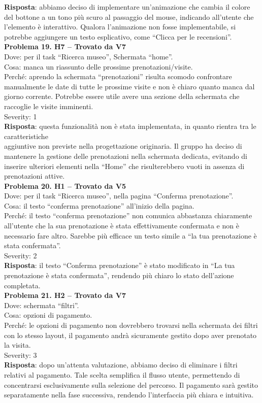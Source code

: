 \documentclass{article}
\begin{document}
\noindent \textbf{Risposta}: abbiamo deciso di implementare un'animazione che cambia il colore del bottone a un tono più scuro al passaggio del mouse, indicando all’utente che l’elemento è interattivo. Qualora l’animazione non fosse implementabile, si potrebbe aggiungere un testo esplicativo, come “Clicca per le recensioni”.\\

\noindent \textbf{Problema 19. H7 – Trovato da V7} \\
Dove: per il task “Ricerca museo”, Schermata “home”. \\
Cosa: manca un riassunto delle prossime prenotazioni/visite. \\
Perché: aprendo la schermata “prenotazioni” risulta scomodo confrontare manualmente le date di tutte le prossime visite e non è chiaro quanto manca dal giorno corrente. Potrebbe essere utile avere una sezione della schermata che raccoglie le visite imminenti. \\
Severity: 1 \\
\textbf{Risposta}: questa funzionalità non è stata implementata, in quanto rientra tra le caratteristiche\\ aggiuntive non previste nella progettazione originaria. Il gruppo ha deciso di mantenere la gestione delle prenotazioni nella schermata dedicata, evitando di inserire ulteriori elementi nella “Home” che risulterebbero vuoti in assenza di prenotazioni attive.\\

\noindent \textbf{Problema 20. H1 – Trovato da V5} \\
Dove: per il task “Ricerca museo”, nella pagina “Conferma prenotazione”. \\
Cosa: il testo “conferma prenotazione” all’inizio della pagina. \\
Perché: il testo “conferma prenotazione” non comunica abbastanza chiaramente all’utente che la sua prenotazione è stata effettivamente confermata e non è necessario fare altro. Sarebbe più efficace un testo simile a “la tua prenotazione è stata confermata”. \\
Severity: 2 \\
\textbf{Risposta}: il testo “Conferma prenotazione” è stato modificato in “La tua prenotazione è stata confermata”, rendendo più chiaro lo stato dell’azione completata.\\

\noindent \textbf{Problema 21. H2 – Trovato da V7} \\
Dove: schermata “filtri”. \\
Cosa: opzioni di pagamento. \\
Perché: le opzioni di pagamento non dovrebbero trovarsi nella schermata dei filtri con lo stesso layout, il pagamento andrà sicuramente gestito dopo aver prenotato la visita. \\
Severity: 3 \\
\textbf{Risposta}: dopo un'attenta valutazione, abbiamo deciso di eliminare i filtri relativi al pagamento. Tale scelta semplifica il flusso utente, permettendo di concentrarsi esclusivamente sulla selezione del percorso. Il pagamento sarà gestito separatamente nella fase successiva, rendendo l’interfaccia più chiara e intuitiva.\\
\end{document}

